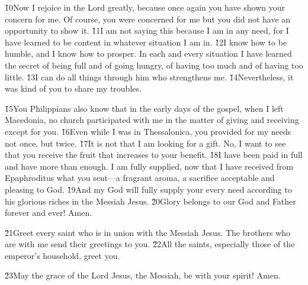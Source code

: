 \v{10}Now I rejoice in the Lord greatly, because once again you have shown your concern for me. Of course, you were concerned for me but you did not have an opportunity to show it. \v{11}I am not saying this because I am in any need, for I have learned to be content in whatever situation I am in. \v{12}I know how to be humble, and I know how to prosper. In each and every situation I have learned the secret of being full and of going hungry, of having too much and of having too little. \v{13}I can do all things through him who strengthens me. \v{14}Nevertheless, it was kind of you to share my troubles.

\v{15}You Philippians also know that in the early days of the gospel, when I left Macedonia, no church participated with me in the matter of giving and receiving except for you. \v{16}Even while I was in Thessalonica, you provided for my needs not once, but twice. \v{17}It is not that I am looking for a gift. No, I want to see that you receive the fruit that increases to your benefit. \v{18}I have been paid in full and have more than enough. I am fully supplied, now that I have received from Epaphroditus what you sent---a fragrant aroma, a sacrifice acceptable and pleasing to God. \v{19}And my God will fully supply your every need according to his glorious riches in the Messiah Jesus. \v{20}Glory belongs to our God and Father forever and ever! Amen.

\v{21}Greet every saint who is in union with the Messiah Jesus. The brothers who are with me send their greetings to you. \v{22}All the saints, especially those of the emperor's household, greet you.

\v{23}May the grace of the Lord Jesus, the Messiah, be with your spirit! Amen.
